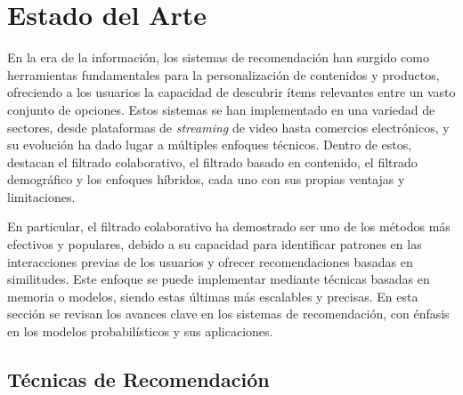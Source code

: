 \documentclass[runningheads,a4paper]{llncs}
\begin{document}
\section{Estado del Arte}

En la era de la información, los sistemas de 
recomendación han surgido como herramientas 
fundamentales para la personalización de contenidos 
y productos, ofreciendo a los usuarios la 
capacidad de descubrir ítems relevantes entre un 
vasto conjunto de opciones. Estos sistemas se han 
implementado en una variedad de sectores, desde 
plataformas de \textit{streaming} de video hasta 
comercios electrónicos, y su evolución ha dado 
lugar a múltiples enfoques técnicos. Dentro de estos, 
destacan el filtrado colaborativo, el filtrado basado 
en contenido, el filtrado demográfico y los enfoques 
híbridos, cada uno con sus propias ventajas y 
limitaciones.

En particular, el filtrado colaborativo ha demostrado 
ser uno de los métodos más efectivos y populares, 
debido a su capacidad para identificar patrones en 
las interacciones previas de los usuarios y ofrecer 
recomendaciones basadas en similitudes. Este enfoque 
se puede implementar mediante técnicas basadas en 
memoria o modelos, siendo estas últimas más escalables 
y precisas. En esta sección se revisan los avances 
clave en los sistemas de recomendación, con énfasis en 
los modelos probabilísticos y sus aplicaciones.

\subsection{Técnicas de Recomendación}
\end{document}
